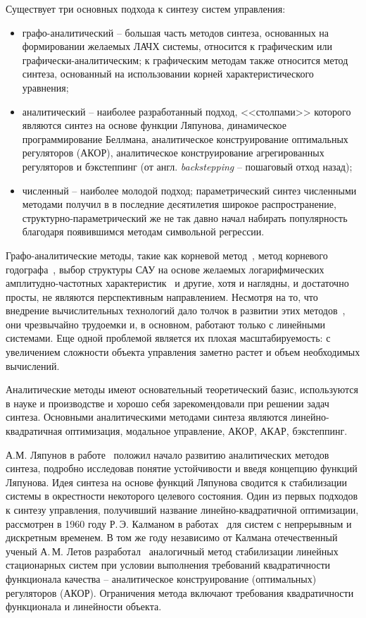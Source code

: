 Существует три основных подхода к синтезу систем управления:
\begin{itemize}
    \item графо-аналитический -- большая часть методов синтеза, основанных на формировании желаемых ЛАЧХ системы, относится к графическим или графически-аналитическим; к графическим методам также относится метод синтеза, основанный на использовании корней характеристического уравнения;
    \item аналитический -- наиболее разработанный подход, <<столпами>> которого являются синтез на основе функции Ляпунова, динамическое программирование Беллмана, аналитическое конструирование оптимальных регуляторов (АКОР), аналитическое конструирование агрегированных регуляторов и бэкстеппинг (от англ. \textit{backstepping} -- пошаговый отход назад);
    \item численный -- наиболее молодой подход; параметрический синтез численными методами получил в в последние десятилетия широкое распространение, структурно-параметрический же не так давно начал набирать популярность благодаря появившимся методам символьной регрессии.
\end{itemize}

Графо-аналитические методы, такие как корневой метод~\cite{Соколов1952}, метод корневого годографа~\cite{Kuo1967}, выбор структуры САУ на основе желаемых логарифмических амплитудно-частотных характеристик~\cite{Солодовников1953} и другие, хотя и наглядны, и достаточно просты, не являются перспективным направлением. Несмотря на то, что внедрение вычислительных технологий дало толчок в развитии этих методов~\cite{Барковский1981, Имаев1998}, они чрезвычайно трудоемки и, в основном, работают только с линейными системами. Еще одной проблемой является их плохая масштабируемость: с увеличением сложности объекта управления заметно растет и объем необходимых вычислений.

Аналитические методы имеют основательный теоретический базис, используются в науке и производстве и хорошо себя зарекомендовали при решении задач синтеза. Основными аналитическими методами синтеза являются линейно-квадратичная оптимизация, модальное управление, АКОР, АКАР, бэкстеппинг.

А.М. Ляпунов в работе~\cite{Ляпунов1935} положил начало развитию аналитических методов синтеза, подробно исследовав понятие устойчивости и введя концепцию функций Ляпунова.
Идея синтеза на основе функций Ляпунова сводится к стабилизации системы в окрестности некоторого целевого состояния.
Один из первых подходов к синтезу управления, получивший название линейно-квадратичной оптимизации, рассмотрен в 1960 году Р.\,Э. Калманом в работах~\cite{Kalman1960, Kalman1960a} для систем с непрерывным и дискретным временем.
В том же году независимо от Калмана отечественный ученый А.\,М. Летов разработал~\cite{Летов1960,Летов1960a,Летов1960b,Летов1961,Летов1962} аналогичный метод стабилизации линейных стационарных систем при условии выполнения требований квадратичности функционала качества -- аналитическое конструирование (оптимальных) регуляторов (АКОР).
Ограничения метода включают требования квадратичности функционала и линейности объекта.


